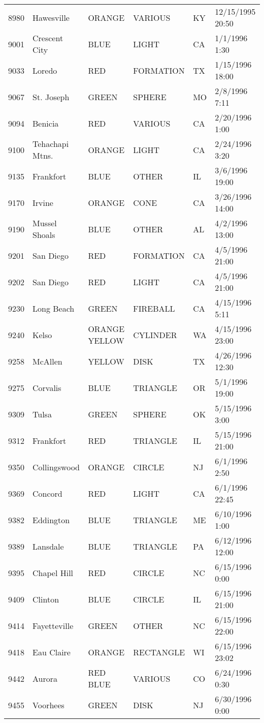 \begin{tabular}{llllll}
8980 & Hawesville & ORANGE & VARIOUS & KY & 12/15/1995 20:50 \\
9001 & Crescent City & BLUE & LIGHT & CA & 1/1/1996 1:30 \\
9033 & Loredo & RED & FORMATION & TX & 1/15/1996 18:00 \\
9067 & St. Joseph & GREEN & SPHERE & MO & 2/8/1996 7:11 \\
9094 & Benicia & RED & VARIOUS & CA & 2/20/1996 1:00 \\
9100 & Tehachapi Mtns. & ORANGE & LIGHT & CA & 2/24/1996 3:20 \\
9135 & Frankfort & BLUE & OTHER & IL & 3/6/1996 19:00 \\
9170 & Irvine & ORANGE & CONE & CA & 3/26/1996 14:00 \\
9190 & Mussel Shoals & BLUE & OTHER & AL & 4/2/1996 13:00 \\
9201 & San Diego & RED & FORMATION & CA & 4/5/1996 21:00 \\
9202 & San Diego & RED & LIGHT & CA & 4/5/1996 21:00 \\
9230 & Long Beach & GREEN & FIREBALL & CA & 4/15/1996 5:11 \\
9240 & Kelso & ORANGE YELLOW & CYLINDER & WA & 4/15/1996 23:00 \\
9258 & McAllen & YELLOW & DISK & TX & 4/26/1996 12:30 \\
9275 & Corvalis & BLUE & TRIANGLE & OR & 5/1/1996 19:00 \\
9309 & Tulsa & GREEN & SPHERE & OK & 5/15/1996 3:00 \\
9312 & Frankfort & RED & TRIANGLE & IL & 5/15/1996 21:00 \\
9350 & Collingswood & ORANGE & CIRCLE & NJ & 6/1/1996 2:50 \\
9369 & Concord & RED & LIGHT & CA & 6/1/1996 22:45 \\
9382 & Eddington & BLUE & TRIANGLE & ME & 6/10/1996 1:00 \\
9389 & Lansdale & BLUE & TRIANGLE & PA & 6/12/1996 12:00 \\
9395 & Chapel Hill & RED & CIRCLE & NC & 6/15/1996 0:00 \\
9409 & Clinton & BLUE & CIRCLE & IL & 6/15/1996 21:00 \\
9414 & Fayetteville & GREEN & OTHER & NC & 6/15/1996 22:00 \\
9418 & Eau Claire & ORANGE & RECTANGLE & WI & 6/15/1996 23:02 \\
9442 & Aurora & RED BLUE & VARIOUS & CO & 6/24/1996 0:30 \\
9455 & Voorhees & GREEN & DISK & NJ & 6/30/1996 0:00 \\

\end{tabular}
